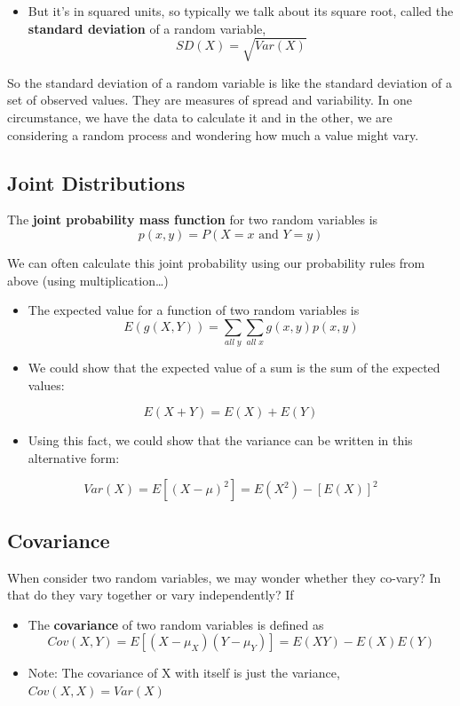 \documentclass[
]{book}
\providecommand{\tightlist}{%
  \setlength{\itemsep}{0pt}\setlength{\parskip}{0pt}}
\begin{document}
\begin{itemize}
\tightlist
\item
  But it's in squared units, so typically we talk about its square root, called the \textbf{standard deviation} of a random variable,
  \[SD(X) = \sqrt{Var(X)}\]
\end{itemize}

So the standard deviation of a random variable is like the standard deviation of a set of observed values. They are measures of spread and variability. In one circumstance, we have the data to calculate it and in the other, we are considering a random process and wondering how much a value might vary.

\subsection{Joint Distributions}\label{joint-distributions}

The \textbf{joint probability mass function} for two random variables is
\[p(x,y) = P(X=x \text{ and }Y = y)\]

We can often calculate this joint probability using our probability rules from above (using multiplication\ldots)

\begin{itemize}
\item
  The expected value for a function of two random variables is
  \[E(g(X,Y)) = \sum_{all\; y}\sum_{all\; x} g(x,y)p(x,y)\]
\item
  We could show that the expected value of a sum is the sum of the expected values:
\end{itemize}

\[E(X+Y) = E(X) + E(Y)\]

\begin{itemize}
\tightlist
\item
  Using this fact, we could show that the variance can be written in this alternative form:
\end{itemize}

\[Var(X) = E[(X-\mu)^2] = E(X^2) - [E(X)]^2\]

\subsection{Covariance}\label{covariance}

When consider two random variables, we may wonder whether they co-vary? In that do they vary together or vary independently? If

\begin{itemize}
\item
  The \textbf{covariance} of two random variables is defined as
  \[Cov(X,Y) = E[(X - \mu_X)(Y - \mu_Y)] = E(XY) - E(X)E(Y)\]
\item
  Note: The covariance of X with itself is just the variance, \(Cov(X,X) = Var(X)\)
\end{itemize}
\end{document}
